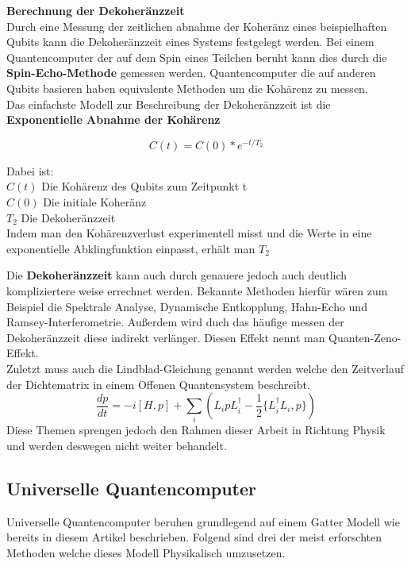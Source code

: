 \textbf{Berechnung der Dekoheränzzeit}\\
Durch eine Messung der zeitlichen abnahme der Koheränz eines beispielhaften Qubits kann die Dekoheränzzeit eines Systems festgelegt werden.
Bei einem Quantencomputer der auf dem Spin eines Teilchen beruht kann dies durch die \textbf{Spin-Echo-Methode} gemessen werden.
Quantencomputer die auf anderen Qubits basieren haben equivalente Methoden um die Kohärenz zu messen.\\

Das einfachste Modell zur Beschreibung der Dekoheränzzeit ist die \textbf{Exponentielle Abnahme der Kohärenz}

\begin{equation}
    C(t) = C(0)*e^{-t/T_2}
\end{equation}

Dabei ist:\\
$C(t)$ Die Kohärenz des Qubits zum Zeitpunkt t\\
$C(0)$ Die initiale Koheränz\\
$T_2$ Die Dekoheränzzeit\\

Indem man den Kohärenzverlust experimentell misst und die Werte in eine exponentielle Abklingfunktion einpasst, erhält man $T_2$\\

\begin{tcolorbox}[title=Kommentar,
    title filled=false,
    colback=cyan!5!white,
    colframe=cyan!75!black]
    Die \textbf{Dekoheränzzeit} kann auch durch genauere jedoch auch deutlich kompliziertere weise errechnet werden.
    Bekannte Methoden hierfür wären zum Beispiel die Spektrale Analyse, Dynamische Entkopplung, Hahn-Echo und Ramsey-Interferometrie.
    Außerdem wird duch das häufige messen der Dekoheränzzeit diese indirekt verlänger. Diesen Effekt nennt man Quanten-Zeno-Effekt.\\
    Zuletzt muss auch die Lindblad-Gleichung genannt werden welche den Zeitverlauf der Dichtematrix in einem Offenen Quantensystem beschreibt.
    \begin{equation}
        \frac{dp}{dt} = -i[H,p]+\sum_i(L_ipL^\dagger_i-\frac{1}{2}\{L^\dagger_i L_i,p\})
    \end{equation}
    Diese Themen sprengen jedoch den Rahmen dieser Arbeit in Richtung Physik und werden deswegen nicht weiter behandelt.
\end{tcolorbox}

\subsection{Universelle Quantencomputer}
\label{sub:universelle_quantencomputer}
Universelle Quantencomputer beruhen grundlegend auf einem Gatter Modell wie bereits in diesem Artikel beschrieben. Folgend sind drei der meist erforschten
Methoden welche dieses Modell Physikalisch umzusetzen.\\

